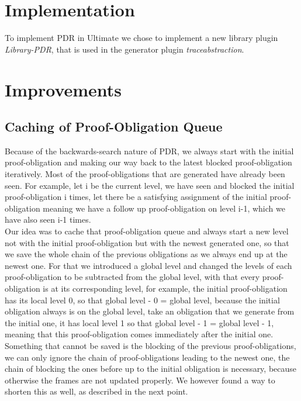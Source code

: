 \documentclass[11pt, a4paper, BCOR=10mm, ngerman, oneside]{scrbook}
\begin{document}
\section{Implementation}
To implement PDR in Ultimate we chose to implement a new library plugin \textsl{Library-PDR}, that is used in the generator plugin \textsl{traceabstraction}.

\section{Improvements}
\subsection{Caching of Proof-Obligation Queue}
Because of the backwards-search nature of PDR, we always start with the initial proof-obligation and making our way back to the latest blocked proof-obligation iteratively. Most of the proof-obligations that are generated have already been seen. For example, let i be the current level, we have seen and blocked the initial proof-obligation i times, let there be a satisfying assignment of the initial proof-obligation meaning we have a follow up proof-obligation on level i-1, which we have also seen i-1 times. \\
Our idea was to cache that proof-obligation queue and always start a new level not with the initial proof-obligation but with the newest generated one, so that we save the whole chain of the previous obligations as we always end up at the newest one. For that we introduced a global level and changed the levels of each proof-obligation to be subtracted from the global level, with that every proof-obligation is at its corresponding level, for example, the initial proof-obligation has its local level 0, so that global level - 0 = global level, because the initial obligation always is on the global level, take an obligation that we generate from the initial one, it has local level 1 so that global level - 1 = global level - 1, meaning that this proof-obligation comes immediately after the initial one. \\
Something that cannot be saved is the blocking of the previous proof-obligations, we can only ignore the chain of proof-obligations leading to the newest one, the chain of blocking the ones before up to the initial obligation is necessary, because otherwise the frames are not updated properly. We however found a way to shorten this as well, as described in the next point. \\ \\
\end{document}
